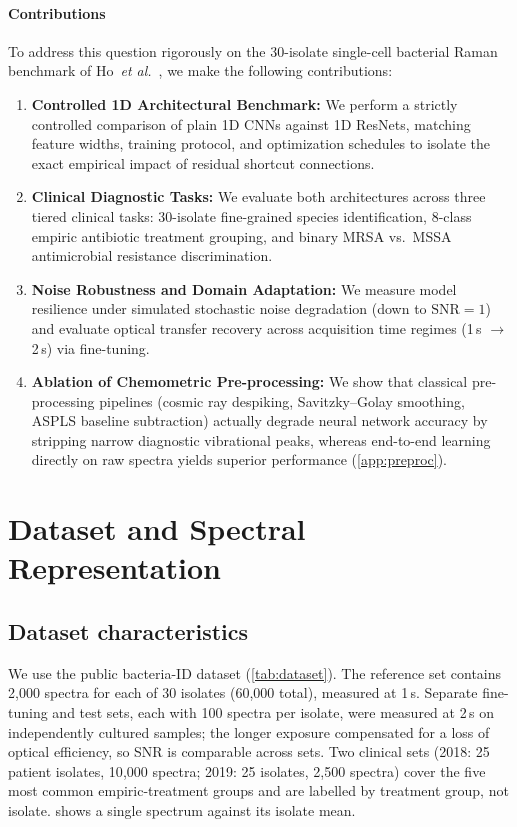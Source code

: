 \documentclass[journal,onecolumn]{IEEEtran}
\newcommand{\sunit}[1]{#1\,s}             %
\begin{document}
\paragraph*{Contributions}
To address this question rigorously on the 30-isolate single-cell bacterial
Raman benchmark of Ho~\textit{et al.}~\cite{ho2019rapid}, we make the
following contributions:
\begin{enumerate}
  \item \textbf{Controlled 1D Architectural Benchmark:} We perform a strictly
        controlled comparison of plain 1D CNNs against 1D ResNets, matching
        feature widths, training protocol, and optimization schedules to isolate
        the exact empirical impact of residual shortcut connections.
  \item \textbf{Clinical Diagnostic Tasks:} We evaluate both architectures
        across three tiered clinical tasks: 30-isolate fine-grained species
        identification, 8-class empiric antibiotic treatment grouping, and
        binary MRSA vs.\ MSSA antimicrobial resistance discrimination.
  \item \textbf{Noise Robustness and Domain Adaptation:} We measure model
        resilience under simulated stochastic noise degradation (down to
        $\mathrm{SNR}=1$) and evaluate optical transfer recovery across
        acquisition time regimes (\sunit{1} $\rightarrow$ \sunit{2}) via
        fine-tuning.
  \item \textbf{Ablation of Chemometric Pre-processing:} We show that classical
        pre-processing pipelines (cosmic ray despiking, Savitzky--Golay
        smoothing, ASPLS baseline subtraction) actually degrade neural network
        accuracy by stripping narrow diagnostic vibrational peaks, whereas
        end-to-end learning directly on raw spectra yields superior performance
        (\cref{app:preproc}).
\end{enumerate}

\section{Dataset and Spectral Representation}
\label{sec:data}

\subsection{Dataset characteristics}
We use the public bacteria-ID dataset \cite{ho2019rapid}
(\cref{tab:dataset}). The reference set contains 2{,}000 spectra for each
of 30 isolates (60{,}000 total), measured at \sunit{1}. Separate
fine-tuning and test sets, each with 100 spectra per isolate, were
measured at \sunit{2} on independently cultured samples; the longer
exposure compensated for a loss of optical efficiency, so SNR is
comparable across sets. Two clinical sets (2018: 25 patient isolates,
10{,}000 spectra; 2019: 25 isolates, 2{,}500 spectra) cover the five most
common empiric-treatment groups and are labelled by treatment group, not
isolate.  shows a single spectrum against its isolate
mean.
\end{document}
